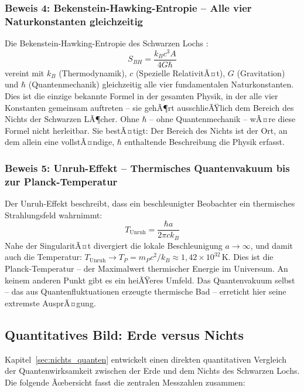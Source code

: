 ﻿\documentclass[12pt,a4paper]{report}
\begin{document}
\subsubsection{Beweis 4: Bekenstein-Hawking-Entropie -- Alle vier Naturkonstanten gleichzeitig}

Die Bekenstein-Hawking-Entropie des Schwarzen Lochs \cite{bekenstein1973,hawking1975}:
\begin{equation*}
    S_{BH} = \frac{k_B c^3 A}{4 G \hbar}
\end{equation*}
vereint mit $k_B$ (Thermodynamik), $c$ (Spezielle RelativitÃ¤t), $G$ (Gravitation) und $\hbar$ (Quantenmechanik) gleichzeitig alle vier fundamentalen Naturkonstanten. Dies ist die einzige bekannte Formel in der gesamten Physik, in der alle vier Konstanten gemeinsam auftreten -- sie gehÃ¶rt ausschlieÃŸlich dem Bereich des Nichts der Schwarzen LÃ¶cher. Ohne $\hbar$ -- ohne Quantenmechanik -- wÃ¤re diese Formel nicht herleitbar. Sie bestÃ¤tigt: Der Bereich des Nichts ist der Ort, an dem allein eine vollstÃ¤ndige, $\hbar$ enthaltende Beschreibung die Physik erfasst.

\subsubsection{Beweis 5: Unruh-Effekt -- Thermisches Quantenvakuum bis zur Planck-Tempe\-ratur}

Der Unruh-Effekt \cite{unruh1976} beschreibt, dass ein beschleunigter Beobachter ein thermisches Strahlungsfeld wahrnimmt:
\begin{equation*}
    T_{\mathrm{Unruh}} = \frac{\hbar a}{2\pi c k_B}
\end{equation*}
Nahe der SingularitÃ¤t divergiert die lokale Beschleunigung $a \to \infty$, und damit auch die Temperatur: $T_{\mathrm{Unruh}} \to T_P = m_P c^2 / k_B \approx 1{,}42 \times 10^{32}\,\text{K}$. Dies ist die Planck-Temperatur -- der Maximalwert thermischer Energie im Universum. An keinem anderen Punkt gibt es ein heiÃŸeres Umfeld. Das Quantenvakuum selbst -- das aus Quantenfluktuationen erzeugte thermische Bad -- erreticht hier seine extremste AusprÃ¤gung.

\subsection{Quantitatives Bild: Erde versus Nichts}

Kapitel~\ref{sec:nichts_quanten} entwickelt einen direkten quantitativen Vergleich der Quantenwirksamkeit zwischen der Erde und dem Nichts des Schwarzen Lochs. Die folgende Ãœbersicht fasst die zentralen Messzahlen zusammen:
\end{document}
